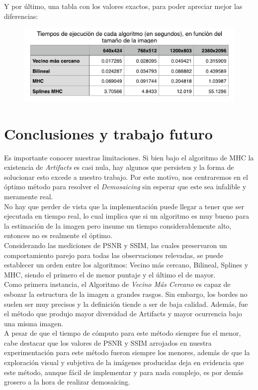 \documentclass[a4paper]{article}
\begin{document}
Y por último, una tabla con los valores exactos, para poder apreciar mejor las diferencias:
\begin{figure}[h!]
    \begin{center}
    \includegraphics[scale=0.70]{imagenes/tiempos/todost.png}
    \label{tiempos3}
  \end{center}
\end{figure}

\newpage
\section{Conclusiones y trabajo futuro}



Es importante conocer nuestras limitaciones. Si bien bajo el algoritmo de MHC la existencia de \emph{Artifacts} es casi nula, hay algunos que persisten y la forma de solucionar esto excede a nuestro trabajo. Por este motivo, nos centraremos en el \'optimo m\'etodo para resolver el \emph{Demosaicing} sin esperar que este sea infalible y meramente real.\\

No hay que perder de vista que la implementación puede llegar a tener que ser ejecutada en tiempo real, lo cual implica que si un algoritmo es muy bueno para la estimaci\'on de la imagen pero insume un tiempo considerablemente alto, entonces no es realmente el óptimo.\\

Considerando las mediciones de PSNR y SSIM, las cuales preservaron un comportamiento parejo para todas las observaciones relevadas, se puede establecer un orden entre los algoritmos: Vecino m\'as cercano, Bilineal, Splines y MHC, siendo el primero el de menor puntaje y el \'ultimo el de mayor.\\

Como primera instancia, el Algoritmo de\textit{ Vecino M\'as Cercano} es capaz de esbozar la estructura de la imagen a grandes rasgos. Sin embargo, los bordes no suelen ser muy precisos y la definici\'on tiende a ser de baja calidad.  Además, fue el método que produjo mayor diversidad de Artifacts y mayor ocurrencia bajo una misma imagen.\\
A pesar de que el tiempo de cómputo para este método siempre fue el menor, cabe destacar que los valores de PSNR y SSIM arrojados en nuestra experimentaci\'on para este m\'etodo fueron siempre los menores, además de que la exploración visual y subjetiva de la imágenes producidas deja en evidencia que este método, aunque fácil de implementar y para nada complejo, es por demás grosero a la hora de realizar demosaicing.\\
\end{document}

